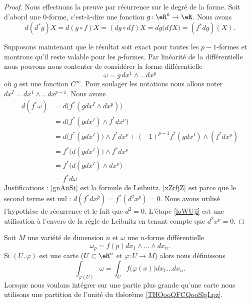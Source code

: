\begin{proof}
	Nous effectuons la preuve par récurrence sur le degré de la forme. Soit d'abord une \( 0\)-forme, c'est-à-dire une fonction \( g\colon \eR^n\to \eR\). Nous avons
	\begin{equation}
		d(d^*g)X=d(g\circ f)X=(dg\circ df)X=dg\big( df X \big)=(f^*dg)(X).
	\end{equation}

	Supposons maintenant que le résultat soit exact pour toutes les \( p-1\)-formes et montrons qu'il reste valable pour les \( p\)-formes. Par linéarité de la différentielle nous pouvons nous contenter de considérer la forme différentielle
	\begin{equation}
		\omega=g\,dx^1\wedge\ldots dx^p
	\end{equation}
	où \( g\) est une fonction \(  C^{\infty}\). Pour soulager les notations nous allons noter \( dx^I=dx^1\wedge\ldots dx^{p-1}\). Nous avons
	\begin{subequations}
		\begin{align}
			d(f^*\omega) & =d\big( f^*(gdx^I\wedge dx^p) \big)                                                       \\
			             & =d\big( f^*(gdx^I)\wedge f^*dx^p \big)                                                    \\
			             & =d\big( f^*(gdx^I)\big)\wedge f^*dx^p+(-1)^{p-1}f^*(gdx^I)\wedge(f^*dx^p)  \label{gnAnSt} \\
			             & =f^*\big( d(gdx^I) \big)\wedge f^*dx^p      \label{xZrfjZ}                                \\
			             & =f^*\big( d(gdx^I)\wedge dx^p \big)                                                       \\
			             & =f^*d\omega        \label{loWUji}
		\end{align}
	\end{subequations}
	Justifications : \eqref{gnAnSt} est la formule de Leibnitz. \eqref{xZrfjZ} est parce que le second terme est nul : \( d(f^*dx^p)=f^*(d^2x^p)=0\). Nous avons utilisé l'hypothèse de récurrence et le fait que \( d^2=0\). L'étape \eqref{loWUji} est une utilisation à l'envers de la règle de Leibnitz en tenant compte que \( d^2x^p=0\).
\end{proof}


Soit \( M\) une variété de dimension \( n\) et \( \omega\) une \( n\)-forme différentielle
\begin{equation}
	\omega_p=f(p)dx_1\wedge\ldots\wedge dx_n.
\end{equation}
Si \( (U,\varphi)\) est une carte (\( U\subset\eR^n\) et \( \varphi\colon U\to M\)) alors nous définissons
\begin{equation}
	\int_{\varphi(U)}\omega=\int_{U}f\big( \varphi(x) \big)dx_1\ldots dx_n.
\end{equation}
Lorsque nous voulons intégrer sur une partie plus grande qu'une carte nous utilisons une partition de l'unité du théorème \ref{THOooQFCQooSlgLpz}.


